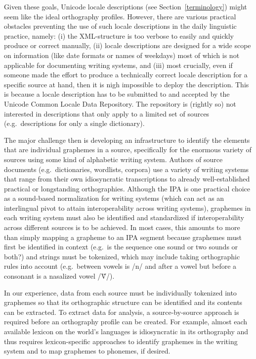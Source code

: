 Given these goals, Unicode locale descriptions (see Section~\ref{terminology})
might seem like the ideal orthography profiles. However, there are various
practical obstacles preventing the use of such locale descriptions in the daily
linguistic practice, namely: (i) the XML-structure is too verbose to easily and
quickly produce or correct manually, (ii) locale descriptions are designed for a
wide scope on information (like date formats or names of weekdays) most of which
is not applicable for documenting writing systems, and (iii) most crucially,
even if someone made the effort to produce a technically correct locale
description for a specific source at hand, then it is nigh impossible to deploy
the description. This is because a locale description has to be submitted to and
accepted by the Unicode Common Locale Data Repository. The repository is
(rightly so) not interested in descriptions that only apply to a limited set of
sources (e.g.~descriptions for only a single dictionary).

The major challenge then is developing an infrastructure to identify the
elements that are individual graphemes in a source, specifically for the
enormous variety of sources using some kind of alphabetic writing system.
Authors of source documents (e.g.~dictionaries, wordlists, corpora) use a
variety of writing systems that range from their own idiosyncratic
transcriptions to already well-established practical or longstanding
orthographies. Although the IPA is one practical choice as a sound-based
normalization for writing systems (which can act as an interlingual pivot to
attain interoperability across writing systems), graphemes in each writing
system must also be identified and standardized if interoperability across
different sources is to be achieved. In most cases, this amounts to more than
simply mapping a grapheme to an IPA segment because graphemes must first be
identified in context (e.g.~is the sequence one sound or two sounds or both?)
and strings must be tokenized, which may include taking orthographic rules into
account (e.g.~between vowels is /n/ and after a vowel but before a consonant is
a nasalized vowel /Ṽ/).

In our experience, data from each source must be
individually tokenized into graphemes so that its orthographic structure can be 
identified and its contents can be extracted. To extract data for analysis, a
source-by-source approach is required before an orthography profile can be
created. For example, almost each available lexicon on the world's languages is
idiosyncratic in its orthography and thus requires lexicon-specific approaches
to identify graphemes in the writing system and to map graphemes to phonemes, if
desired.


